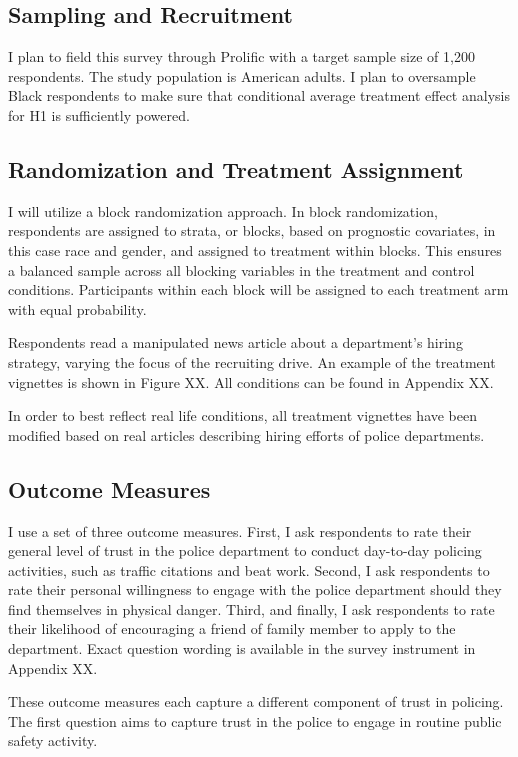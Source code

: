 \documentclass[12pt]{article}
\begin{document}
\subsection{Sampling and Recruitment}

I plan to field this survey through Prolific with a target sample size of 1,200 respondents. The study population is American adults. I plan to oversample Black respondents to make sure that conditional average treatment effect analysis for H1 is sufficiently powered.

\subsection{Randomization and Treatment Assignment}

I will utilize a block randomization approach. In block randomization, respondents are assigned to strata, or blocks, based on prognostic covariates, in this case race and gender, and assigned to treatment within blocks. This ensures a balanced sample across all blocking variables in the treatment and control conditions. Participants within each block will be assigned to each treatment arm with equal probability.

Respondents read a manipulated news article about a department’s hiring strategy, varying the focus of the recruiting drive. An example of the treatment vignettes is shown in Figure XX. All conditions can be found in Appendix XX.

In order to best reflect real life conditions, all treatment vignettes have been modified based on real articles describing hiring efforts of police departments. 

\subsection{Outcome Measures}

I use a set of three outcome measures. First, I ask respondents to rate their general level of trust in the police department to conduct day-to-day policing activities, such as traffic citations and beat work. Second, I ask respondents to rate their personal willingness to engage with the police department should they find themselves in physical danger. Third, and finally, I ask respondents to rate their likelihood of encouraging a friend of family member to apply to the department. Exact question wording is available in the survey instrument in Appendix XX.

These outcome measures each capture a different component of trust in policing. The first question aims to capture trust in the police to engage in routine public safety activity. 
\end{document}
